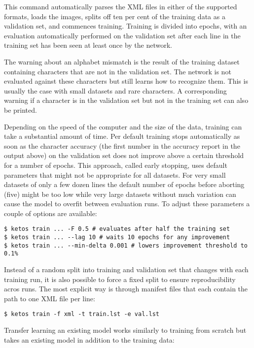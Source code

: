 This command automatically parses the XML files in either of the supported
formats, loads the images, splits off ten per cent of the training data as a
validation set, and commences training. Training is divided into epochs, with
an evaluation automatically performed on the validation set after each line in
the training set has been seen at least once by the network. 

The warning about an alphabet mismatch is the result of the training dataset
containing characters that are not in the validation set. The network is not
evaluated against these characters but still learns how to recognize them. This
is usually the case with small datasets and rare characters. A corresponding
warning if a character is in the validation set but not in the training set
can also be printed.

Depending on the speed of the computer and the size of the data, training can
take a substantial amount of time. Per default training stops automatically as
soon as the character accuracy (the first number in the accuracy report in the
output above) on the validation set does not improve above a certain threshold
for a number of epochs. This approach, called early stopping, uses default
parameters that might not be appropriate for all datasets. For very small
datasets of only a few dozen lines the default number of epochs before aborting
(five) might be too low while very large datasets without much variation can
cause the model to overfit between evaluation runs. To adjust these parameters
a couple of options are available:

\begin{verbatim}
$ ketos train ... -F 0.5 # evaluates after half the training set
$ ketos train ... --lag 10 # waits 10 epochs for any improvement
$ ketos train ... --min-delta 0.001 # lowers improvement threshold to 0.1%
\end{verbatim}

Instead of a random split into training and validation set that changes with
each training run, it is also possible to force a fixed split to ensure
reproducibility acros runs. The most explicit way is through manifest files
that each contain the path to one XML file per line:

\begin{verbatim}
$ ketos train -f xml -t train.lst -e val.lst
\end{verbatim}

Transfer learning an existing model works similarly to training from scratch
but takes an existing model in addition to the training data:

